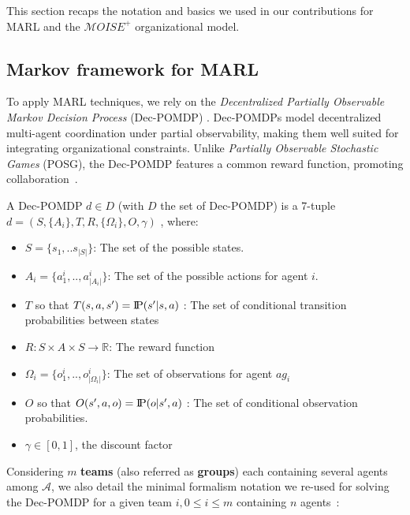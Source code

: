 \documentclass[pdflatex,sn-mathphys-num]{sn-jnl}%
\newcommand{\probP}{\text{I\kern-0.15em P}}
\theoremstyle{thmstyleone}%
\theoremstyle{thmstyletwo}%
\theoremstyle{thmstylethree}%
\begin{document}
This section recaps the notation and basics we used in our contributions for MARL and the $\mathcal{M}OISE^+$ organizational model.

\subsection{Markov framework for MARL}

To apply MARL techniques, we rely on the \textit{Decentralized Partially Observable Markov Decision Process} (Dec-POMDP) \cite{Oliehoek2016}. Dec-POMDPs model decentralized multi-agent coordination under partial observability, making them well suited for integrating organizational constraints. Unlike \textit{Partially Observable Stochastic Games} (POSG), the Dec-POMDP features a common reward function, promoting collaboration~\cite{Beynier2013}.

A Dec-POMDP $d \in D$ (with $D$ the set of Dec-POMDP) is a 7-tuple $d = (S,\{A_i\},T,R,\{\Omega_i\},O,\gamma)$ , where:
\begin{itemize}
    \item $S = \{s_1, ..s_{|S|}\}$: The set of the possible states.
    \item $A_{i} = \{a_{1}^{i},..,a_{|A_{i}|}^{i}\}$: The set of the possible actions for agent $i$.
    \item $T$ so that $T(s,a,s') = \probP{(s'|s,a)}$ : The set of conditional transition probabilities between states
    \item $R: S \times A \times S \rightarrow \mathbb{R}$: The reward function
    \item $\Omega_{i} = \{o_{1}^{i},..,o_{|\Omega_{i}|}^{i}\}$: The set of observations for agent $ag_i$
    \item $O$ so that $O(s',a,o) = \probP{(o|s',a)}$ : The set of conditional observation probabilities.
    \item $\gamma \in [0,1]$, the discount factor
\end{itemize}

Considering $m$ \textbf{teams} (also referred as \textbf{groups}) each containing several agents among $\mathcal{A}$, we also detail the minimal formalism notation we re-used for solving the Dec-POMDP for a given team $i, 0 \leq i \leq m$ containing $n$ agents~\citep{Beynier2013,Albrecht2024}:
\end{document}
